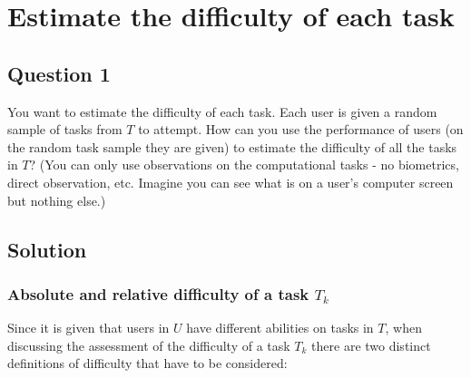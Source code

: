 \chapter{Estimate the difficulty of each task} \label{ch:q1_difficulty}

\section{Question 1} \label{sec:q1}

You want to estimate the difficulty of each task.
Each user is given a random sample of tasks from $T$ to attempt.
How can you use the performance of users (on the random task sample they are given) to estimate the difficulty of all the tasks in $T$?
(You can only use observations on the computational tasks - no biometrics, direct observation, etc.
Imagine you can see what is on a user's computer screen but nothing else.)

\section{Solution} \label{sec:q1_solution}

\subsection{Absolute and relative difficulty of a task $T_k$} \label{subsec:q1_abs_rel_difficulty}

Since it is given that users in $U$ have different abilities on tasks in $T$, when discussing the assessment of the difficulty of a task $T_k$ there are two distinct definitions of difficulty that have to be considered:


